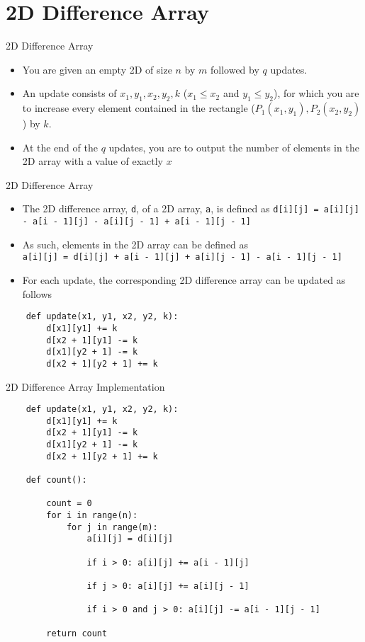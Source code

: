 \documentclass{beamer}
\begin{document}
\section{2D Difference Array}
\begin{frame}[fragile]{2D Difference Array}
    \begin{itemize}
        \item You are given an empty 2D of size $n$ by $m$ followed by $q$ updates.
        \item An update consists of $x_1, y_1, x_2, y_2, k$ ($x_1 \leq x_2$ and $y_1 \leq y_2$), for which you are to increase every element contained in the rectangle ($P_1(x_1, y_1), P_2(x_2, y_2)$) by $k$.
        \item At the end of the $q$ updates, you are to output the number of elements in the 2D array with a value of exactly $x$
    \end{itemize}
\end{frame}

\begin{frame}[fragile]{2D Difference Array}
\begin{itemize}
    \item The 2D difference array, \texttt{d}, of a 2D array, \texttt{a}, is defined as \texttt{d[i][j] = a[i][j] - a[i - 1][j] - a[i][j - 1] + a[i - 1][j - 1]}
    \item As such, elements in the 2D array can be defined as \\ \texttt{a[i][j] = d[i][j] + a[i - 1][j] + a[i][j - 1] - a[i - 1][j - 1]}
    \item For each update, the corresponding 2D difference array can be updated as follows
\end{itemize}

\begin{lstlisting}
    def update(x1, y1, x2, y2, k):
        d[x1][y1] += k
        d[x2 + 1][y1] -= k
        d[x1][y2 + 1] -= k
        d[x2 + 1][y2 + 1] += k
\end{lstlisting}
\end{frame}

\begin{frame}[fragile]{2D Difference Array Implementation}
\begin{lstlisting}
    def update(x1, y1, x2, y2, k):
        d[x1][y1] += k
        d[x2 + 1][y1] -= k
        d[x1][y2 + 1] -= k
        d[x2 + 1][y2 + 1] += k
    
    def count():
    
        count = 0
        for i in range(n):
            for j in range(m):
                a[i][j] = d[i][j]
                
                if i > 0: a[i][j] += a[i - 1][j]

                if j > 0: a[i][j] += a[i][j - 1]
                
                if i > 0 and j > 0: a[i][j] -= a[i - 1][j - 1]
        
        return count
\end{lstlisting}

\end{frame}
\end{document}
